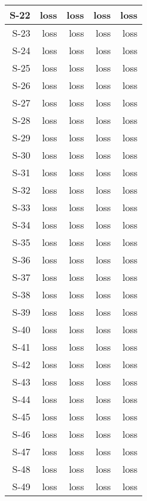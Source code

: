 \begin{tabular}{ | r | r | r | r | r | }
    \hline
         S-22  &   loss  &   loss  &   loss  &   loss  \\
    \hline
         S-23  &   loss  &   loss  &   loss  &   loss  \\
    \hline
         S-24  &   loss  &   loss  &   loss  &   loss  \\
    \hline
         S-25  &   loss  &   loss  &   loss  &   loss  \\
    \hline
         S-26  &   loss  &   loss  &   loss  &   loss  \\
    \hline
         S-27  &   loss  &   loss  &   loss  &   loss  \\
    \hline
         S-28  &   loss  &   loss  &   loss  &   loss  \\
    \hline
         S-29  &   loss  &   loss  &   loss  &   loss  \\
    \hline
         S-30  &   loss  &   loss  &   loss  &   loss  \\
    \hline
         S-31  &   loss  &   loss  &   loss  &   loss  \\
    \hline
         S-32  &   loss  &   loss  &   loss  &   loss  \\
    \hline
         S-33  &   loss  &   loss  &   loss  &   loss  \\
    \hline
         S-34  &   loss  &   loss  &   loss  &   loss  \\
    \hline
         S-35  &   loss  &   loss  &   loss  &   loss  \\
    \hline
         S-36  &   loss  &   loss  &   loss  &   loss  \\
    \hline
         S-37  &   loss  &   loss  &   loss  &   loss  \\
    \hline
         S-38  &   loss  &   loss  &   loss  &   loss  \\
    \hline
         S-39  &   loss  &   loss  &   loss  &   loss  \\
    \hline
         S-40  &   loss  &   loss  &   loss  &   loss  \\
    \hline
         S-41  &   loss  &   loss  &   loss  &   loss  \\
    \hline
         S-42  &   loss  &   loss  &   loss  &   loss  \\
    \hline
         S-43  &   loss  &   loss  &   loss  &   loss  \\
    \hline
         S-44  &   loss  &   loss  &   loss  &   loss  \\
    \hline
         S-45  &   loss  &   loss  &   loss  &   loss  \\
    \hline
         S-46  &   loss  &   loss  &   loss  &   loss  \\
    \hline
         S-47  &   loss  &   loss  &   loss  &   loss  \\
    \hline
         S-48  &   loss  &   loss  &   loss  &   loss  \\
    \hline
         S-49  &   loss  &   loss  &   loss  &   loss  \\
    \hline
\end{tabular}


